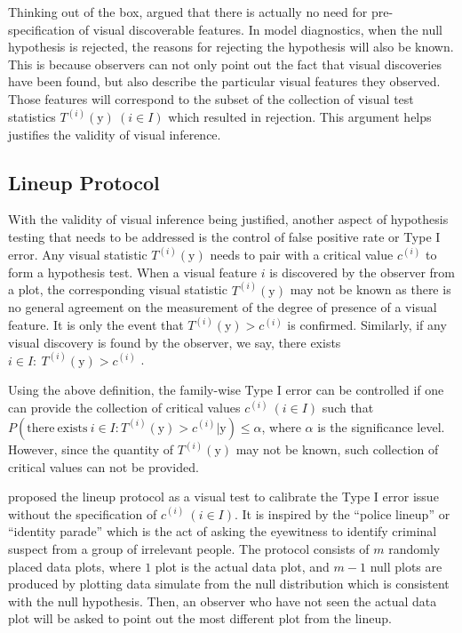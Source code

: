 \documentclass{monashthesis}
\begin{document}
Thinking out of the box, \textcite{buja_statistical_2009} argued that there is actually no need for pre-specification of visual discoverable features. In model diagnostics, when the null hypothesis is rejected, the reasons for rejecting the hypothesis will also be known. This is because observers can not only point out the fact that visual discoveries have been found, but also describe the particular visual features they observed. Those features will correspond to the subset of the collection of visual test statistics \(T^{(i)}(\boldsymbol{\mathrm{y}})~(i \in I)\) which resulted in rejection. This argument helps justifies the validity of visual inference.

\hypertarget{lineup-protocol-1}{%
\subsection{Lineup Protocol}\label{lineup-protocol-1}}

With the validity of visual inference being justified, another aspect of hypothesis testing that needs to be addressed is the control of false positive rate or Type I error. Any visual statistic \(T^{(i)}(\boldsymbol{\mathrm{y}})\) needs to pair with a critical value \(c^{(i)}\) to form a hypothesis test. When a visual feature \(i\) is discovered by the observer from a plot, the corresponding visual statistic \(T^{(i)}(\boldsymbol{\mathrm{y}})\) may not be known as there is no general agreement on the measurement of the degree of presence of a visual feature. It is only the event that \(T^{(i)}(\boldsymbol{\mathrm{y}}) > c^{(i)}\) is confirmed. Similarly, if any visual discovery is found by the observer, we say, there exists \(i \in I:~T^{(i)}(\boldsymbol{\mathrm{y}}) > c^{(i)}\) \autocite{buja_statistical_2009}.

Using the above definition, the family-wise Type I error can be controlled if one can provide the collection of critical values \(c^{(i)}~(i \in I)\) such that \(P(\mathrm{there~exists~} i \in I: T^{(i)}(\boldsymbol{\mathrm{y}}) > c^{(i)}|\boldsymbol{\mathrm{y}}) \leq \alpha\), where \(\alpha\) is the significance level. However, since the quantity of \(T^{(i)}(\boldsymbol{\mathrm{y}})\) may not be known, such collection of critical values can not be provided.

\textcite{buja_statistical_2009} proposed the lineup protocol as a visual test to calibrate the Type I error issue without the specification of \(c^{(i)}~(i \in I)\). It is inspired by the ``police lineup'' or ``identity parade'' which is the act of asking the eyewitness to identify criminal suspect from a group of irrelevant people. The protocol consists of \(m\) randomly placed data plots, where \(1\) plot is the actual data plot, and \(m-1\) null plots are produced by plotting data simulate from the null distribution which is consistent with the null hypothesis. Then, an observer who have not seen the actual data plot will be asked to point out the most different plot from the lineup.
\end{document}
